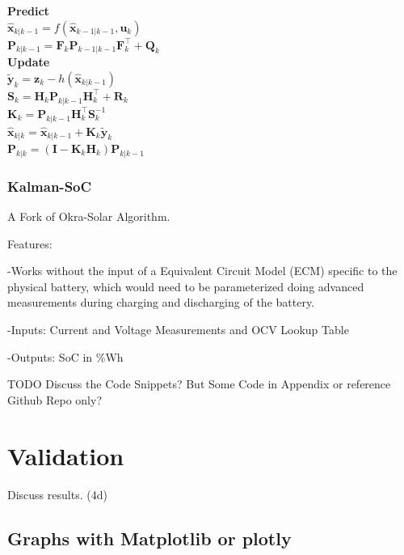 \textbf{Predict} \\
${\displaystyle {\hat {\boldsymbol {x}}}_{k|k-1}=f({\hat {\boldsymbol {x}}}_{k-1|k-1},{\boldsymbol {u}}_{k})} $ \\
${\displaystyle {\boldsymbol {P}}_{k|k-1}={{\boldsymbol {F}}_{k}}{\boldsymbol {P}}_{k-1|k-1}{{\boldsymbol {F}}_{k}^{\top }}+{\boldsymbol {Q}}_{k}}$ \\

\textbf{Update} \\
${\tilde  {{\boldsymbol  {y}}}}_{{k}}={\boldsymbol  {z}}_{{k}}-h({\hat  {{\boldsymbol  {x}}}}_{{k|k-1}})$ \\
${\boldsymbol  {S}}_{{k}}={{{\boldsymbol  {H}}_{{k}}}}{\boldsymbol  {P}}_{{k|k-1}}{{{\boldsymbol  {H}}_{{k}}^{\top }}}+{\boldsymbol  {R}}_{{k}}$ \\
${\boldsymbol  {K}}_{{k}}={\boldsymbol  {P}}_{{k|k-1}}{{{\boldsymbol  {H}}_{{k}}^{\top }}}{\boldsymbol  {S}}_{{k}}^{{-1}}$ \\
${\hat  {{\boldsymbol  {x}}}}_{{k|k}}={\hat  {{\boldsymbol  {x}}}}_{{k|k-1}}+{\boldsymbol  {K}}_{{k}}{\tilde  {{\boldsymbol  {y}}}}_{{k}}$ \\
${\boldsymbol  {P}}_{{k|k}}=({\boldsymbol  {I}}-{\boldsymbol  {K}}_{{k}}{{{\boldsymbol  {H}}_{{k}}}}){\boldsymbol  {P}}_{{k|k-1}}$ \\




\subsection{Kalman-SoC}
A Fork of Okra-Solar Algorithm. \

Features: \

-Works without the input of a Equivalent Circuit Model (ECM) specific to the physical battery, which would need to be parameterized doing advanced measurements during charging and discharging of the battery. 

-Inputs: Current and Voltage Measurements and OCV Lookup Table

-Outputs: SoC in \%Wh

TODO Discuss the Code Snippets? But Some Code in Appendix or reference Github Repo only? 
\chapter{Validation}

Discuss results.  (4d)

\section{Graphs with Matplotlib or plotly}


